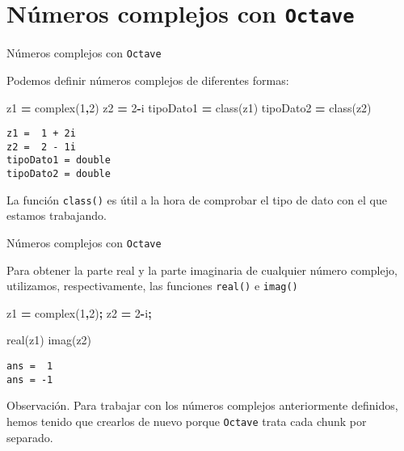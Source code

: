 \documentclass[
  ignorenonframetext,
]{beamer}
\newenvironment{Shaded}{\begin{snugshade}}{\end{snugshade}}
\newcommand{\FloatTok}[1]{\textcolor[rgb]{0.00,0.00,0.81}{#1}}
\newcommand{\FunctionTok}[1]{\textcolor[rgb]{0.00,0.00,0.00}{#1}}
\newcommand{\NormalTok}[1]{#1}
\newcommand{\OperatorTok}[1]{\textcolor[rgb]{0.81,0.36,0.00}{\textbf{#1}}}
\begin{document}
\hypertarget{nuxfameros-complejos-con-octave}{%
\section{\texorpdfstring{Números complejos con
\texttt{Octave}}{Números complejos con Octave}}\label{nuxfameros-complejos-con-octave}}

\begin{frame}[fragile]{Números complejos con \texttt{Octave}}
\protect\hypertarget{nuxfameros-complejos-con-octave-1}{}

Podemos definir números complejos de diferentes formas:

\begin{Shaded}
\begin{Highlighting}[]
\NormalTok{z1 }\OperatorTok{=} \FunctionTok{complex}\NormalTok{(}\FloatTok{1}\OperatorTok{,}\FloatTok{2}\NormalTok{)}
\NormalTok{z2 }\OperatorTok{=} \FloatTok{2}\OperatorTok{-}\FunctionTok{i}
\NormalTok{tipoDato1 }\OperatorTok{=} \FunctionTok{class}\NormalTok{(z1)}
\NormalTok{tipoDato2 }\OperatorTok{=} \FunctionTok{class}\NormalTok{(z2)}
\end{Highlighting}
\end{Shaded}

\begin{verbatim}
z1 =  1 + 2i
z2 =  2 - 1i
tipoDato1 = double
tipoDato2 = double
\end{verbatim}

La función \texttt{class()} es útil a la hora de comprobar el tipo de
dato con el que estamos trabajando.

\end{frame}

\begin{frame}[fragile]{Números complejos con \texttt{Octave}}
\protect\hypertarget{nuxfameros-complejos-con-octave-2}{}

Para obtener la parte real y la parte imaginaria de cualquier número
complejo, utilizamos, respectivamente, las funciones \texttt{real()} e
\texttt{imag()}

\begin{Shaded}
\begin{Highlighting}[]
\NormalTok{z1 }\OperatorTok{=} \FunctionTok{complex}\NormalTok{(}\FloatTok{1}\OperatorTok{,}\FloatTok{2}\NormalTok{)}\OperatorTok{;}
\NormalTok{z2 }\OperatorTok{=} \FloatTok{2}\OperatorTok{-}\FunctionTok{i}\OperatorTok{;}

\FunctionTok{real}\NormalTok{(z1)}
\FunctionTok{imag}\NormalTok{(z2)}
\end{Highlighting}
\end{Shaded}

\begin{verbatim}
ans =  1
ans = -1
\end{verbatim}

Observación. Para trabajar con los números complejos anteriormente
definidos, hemos tenido que crearlos de nuevo porque \texttt{Octave}
trata cada chunk por separado.

\end{frame}
\end{document}

